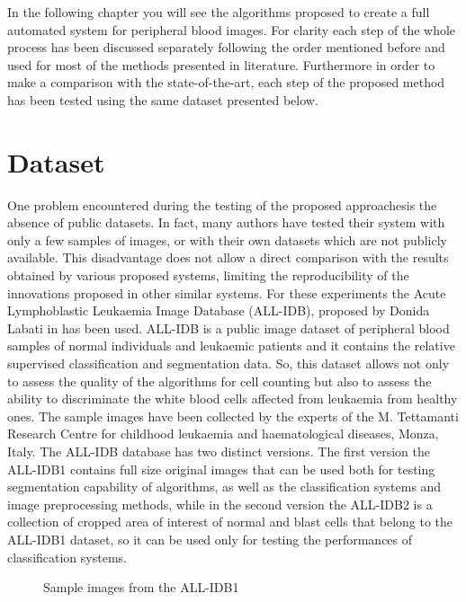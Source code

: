\documentclass[final,a4paper,12pt,english]{UnicaPhdThesis3}
\begin{document}
	In the following chapter you will see the algorithms proposed to create a full automated system for peripheral blood images. For clarity each step of the whole process has been discussed separately following the order mentioned before and used for most of the methods presented in literature. Furthermore in order to make a comparison with the state-of-the-art, each step of the proposed method has been tested using the same dataset presented below.
	
	\section{Dataset}
	One problem encountered during the testing of the proposed approaches ​​is the absence of public datasets. In fact, many authors have tested their system with only a few samples of images, or with their own datasets which are not publicly available. This disadvantage does not allow a direct comparison with the results obtained by various proposed systems, limiting the reproducibility of the innovations proposed in other similar systems. For these experiments the Acute Lymphoblastic Leukaemia Image Database (\acs{ALL-IDB}), proposed by Donida Labati in \cite{Donida} has been used. ALL-IDB is a public image dataset of peripheral blood samples of normal individuals and leukaemic patients and it contains the relative supervised classification and segmentation data. So, this dataset allows not only to assess the quality of the algorithms for cell counting but also to assess the ability to discriminate the white blood cells affected from leukaemia from healthy ones. The sample images have been collected by the experts of the M. Tettamanti Research Centre for childhood leukaemia and haematological diseases, Monza, Italy. The ALL-IDB database has two distinct versions. The first version the ALL-IDB1 contains full size original images that can be used both for testing segmentation capability of algorithms, as well as the classification systems and image preprocessing methods, while in the second version the ALL-IDB2 is a collection of cropped area of interest of normal and blast cells that belong to the ALL-IDB1 dataset, so it can be used only for testing the performances of classification systems.
	
	\begin{figure}[!htbp]
		\centering
		\caption{\label{fig:dataset}Sample images from the ALL-IDB1}
	\end{figure}
	
\end{document}
